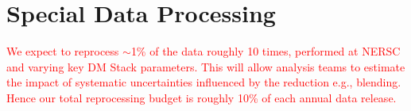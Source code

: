 \documentclass[12pt, letterpaper]{article}
\newcommand{\review}[1]{{\textcolor{red}{#1}}}
\begin{document}
\vspace{.6in}

\section{Special Data Processing}

\review{We expect to reprocess $\sim$1\% of the data roughly 10 times, performed at NERSC and varying key DM Stack parameters.  This will allow analysis teams to estimate the impact of systematic uncertainties influenced by the reduction e.g., blending.  Hence our total reprocessing budget is roughly 10\% of each annual data release.}
  
\end{document}
